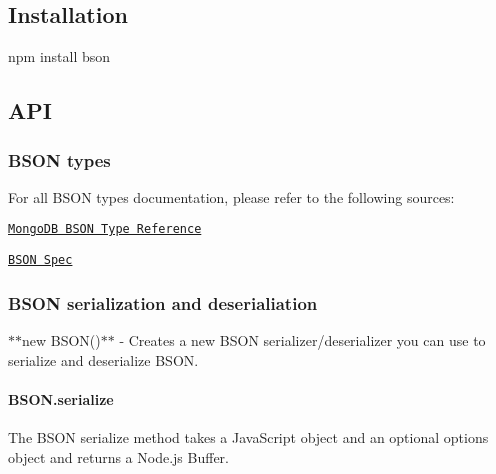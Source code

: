 \subsection*{Installation}

{\ttfamily npm install bson}

\subsection*{A\+PI}

\subsubsection*{B\+S\+ON types}

For all B\+S\+ON types documentation, please refer to the following sources\+:
\begin{DoxyItemize}
\item \href{https://docs.mongodb.com/manual/reference/bson-types/}{\tt Mongo\+DB B\+S\+ON Type Reference}
\item \href{https://bsonspec.org/}{\tt B\+S\+ON Spec}
\end{DoxyItemize}

\subsubsection*{B\+S\+ON serialization and deserialiation}

$\ast$$\ast${\ttfamily new B\+S\+O\+N()}$\ast$$\ast$ -\/ Creates a new B\+S\+ON serializer/deserializer you can use to serialize and deserialize B\+S\+ON.

\paragraph*{B\+S\+O\+N.\+serialize}

The B\+S\+ON {\ttfamily serialize} method takes a Java\+Script object and an optional options object and returns a Node.\+js Buffer.



